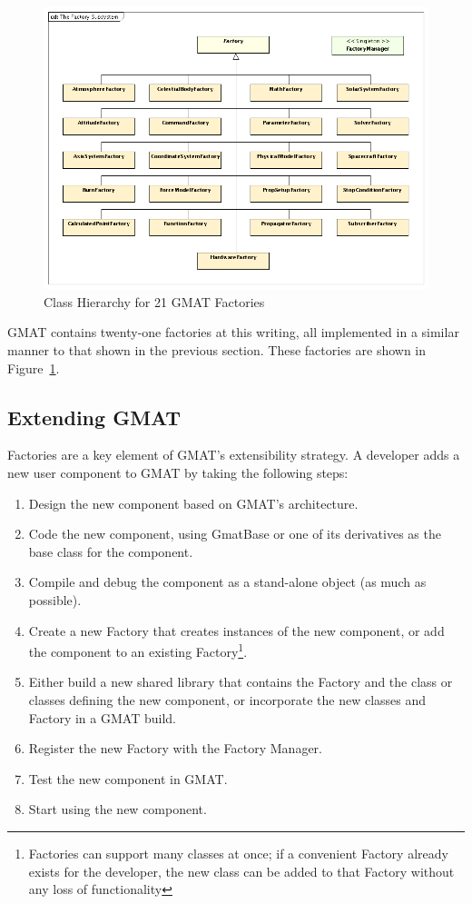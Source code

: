 \begin{figure}[htb]
\begin{center}
\includegraphics[445,221]{Images/TheFactorySubsystem.png}
\caption{\label{figure:TheFactorySubsystem}Class Hierarchy for 21 GMAT Factories}
\end{center}
\end{figure}

GMAT contains twenty-one factories at this writing, all implemented in a similar manner to that
shown in the previous section.  These factories are shown in
Figure~\ref{figure:TheFactorySubsystem}.

\subsection{\label{section:UserObjects}Extending GMAT}

Factories are a key element of GMAT's extensibility strategy.  A developer adds a new user component
to GMAT by taking the following steps:

\begin{enumerate}
  \item Design the new component based on GMAT's architecture.
  \item Code the new component, using GmatBase or one of its derivatives as the base class for the
component.
  \item Compile and debug the component as a stand-alone object (as much as possible).
  \item Create a new Factory that creates instances of the new component, or add the component to an
existing Factory\footnote{Factories can support many classes at once; if a convenient Factory
already exists for the developer, the new class can be added to that Factory without any loss of
functionality}.
  \item \label{item:RuntimeRegister}Either build a new shared library that contains the Factory and
the class or classes defining the new component, or incorporate the new classes and Factory in a
GMAT build.
  \item Register the new Factory with the Factory Manager.
  \item Test the new component in GMAT.
  \item Start using the new component.
\end{enumerate}


